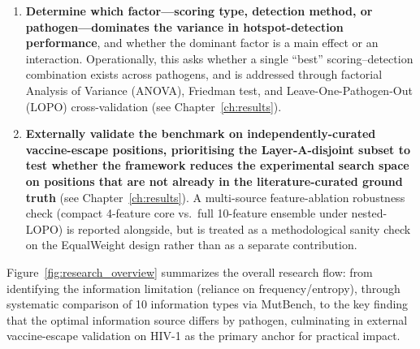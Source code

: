 \begin{enumerate}[label=\textbf{Objective \arabic*.}]
All headline claims belong to the 11-pathogen main panel unless stated otherwise.

  \item \textbf{Determine which factor---scoring type, detection method, or pathogen---dominates the variance in hotspot-detection performance}, and whether the dominant factor is a main effect or an interaction. Operationally, this asks whether a single ``best'' scoring--detection combination exists across pathogens, and is addressed through factorial Analysis of Variance (ANOVA), Friedman test, and Leave-One-Pathogen-Out (LOPO) cross-validation (see Chapter~\ref{ch:results}).

  \item \textbf{Externally validate the benchmark on independently-curated vaccine-escape positions, prioritising the Layer-A-disjoint subset to test whether the framework reduces the experimental search space on positions that are not already in the literature-curated ground truth} (see Chapter~\ref{ch:results}). A multi-source feature-ablation robustness check (compact 4-feature core vs.\ full 10-feature ensemble under nested-LOPO) is reported alongside, but is treated as a methodological sanity check on the EqualWeight design rather than as a separate contribution.
\end{enumerate}

Figure~\ref{fig:research_overview} summarizes the overall research flow: from identifying the information limitation (reliance on frequency/entropy), through systematic comparison of 10 information types via MutBench, to the key finding that the optimal information source differs by pathogen, culminating in external vaccine-escape validation on HIV-1 as the primary anchor for practical impact.

